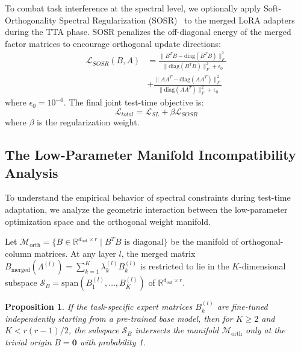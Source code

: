 \documentclass{article}
\theoremstyle{plain}
\newtheorem{proposition}[theorem]{Proposition}
\theoremstyle{definition}
\theoremstyle{remark}
\begin{document}
To combat task interference at the spectral level, we optionally apply Soft-Orthogonality Spectral Regularization (SOSR)~\cite{anonymous2026flatter} to the merged LoRA adapters during the TTA phase. SOSR penalizes the off-diagonal energy of the merged factor matrices to encourage orthogonal update directions:
\begin{equation}
\begin{split}
  \mathcal{L}_{SOSR}(B, A) &= \frac{\|B^T B - \text{diag}(B^T B)\|_F^2}{\|\text{diag}(B^T B)\|_F^2 + \epsilon_0} \\
  &+ \frac{\|A A^T - \text{diag}(A A^T)\|_F^2}{\|\text{diag}(A A^T)\|_F^2 + \epsilon_0}
\end{split}
\end{equation}
where $\epsilon_0 = 10^{-6}$. The final joint test-time objective is:
\begin{equation}
  \mathcal{L}_{total} = \mathcal{L}_{SL} + \beta \mathcal{L}_{SOSR}
\end{equation}
where $\beta$ is the regularization weight.

\subsection{The Low-Parameter Manifold Incompatibility Analysis}

To understand the empirical behavior of spectral constraints during test-time adaptation, we analyze the geometric interaction between the low-parameter optimization space and the orthogonal weight manifold. 

Let $\mathcal{M}_{\text{orth}} = \{ B \in \mathbb{R}^{d_{\text{out}} \times r} \mid B^T B \text{ is diagonal} \}$ be the manifold of orthogonal-column matrices. At any layer $l$, the merged matrix $B_{\text{merged}}(\Lambda^{(l)}) = \sum_{k=1}^K \lambda_k^{(l)} B_k^{(l)}$ is restricted to lie in the $K$-dimensional subspace $\mathcal{S}_B = \text{span}(B_1^{(l)}, \dots, B_K^{(l)})$ of $\mathbb{R}^{d_{\text{out}} \times r}$.

\begin{proposition}
\label{prop:manifold}
If the task-specific expert matrices $B_k^{(l)}$ are fine-tuned independently starting from a pre-trained base model, then for $K \ge 2$ and $K < r(r-1)/2$, the subspace $\mathcal{S}_B$ intersects the manifold $\mathcal{M}_{\text{orth}}$ only at the trivial origin $B = \mathbf{0}$ with probability 1.
\end{proposition}
\end{document}
